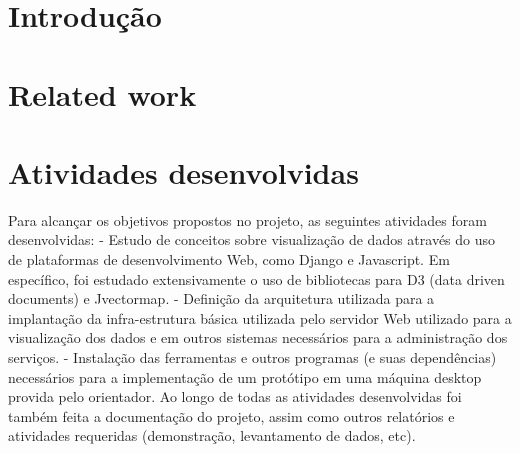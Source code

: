\documentclass[%
        TwoSidePages,%
        Portuguese,%
        TablesPage,%
        FiguresPage,%
        ]
{ic-tese-v2}
\begin{document}
\afterpreface

\chapter{Introdução}

\chapter{Related work}

\chapter{Atividades desenvolvidas}
Para alcançar os objetivos propostos no projeto, as seguintes atividades foram desenvolvidas:
- Estudo de conceitos sobre visualização de dados através do uso de plataformas de desenvolvimento Web, como Django e Javascript. Em específico, foi estudado extensivamente o uso de bibliotecas para D3 (data driven documents) e Jvectormap.
- Definição da arquitetura utilizada para a implantação da infra-estrutura básica utilizada pelo servidor Web utilizado para a visualização dos dados e em outros sistemas necessários para a administração dos serviços.
- Instalação das ferramentas e outros programas (e suas dependências) necessários para a implementação de um protótipo em uma máquina desktop provida pelo orientador.
Ao longo de todas as atividades desenvolvidas foi também feita a documentação do projeto, assim como outros relatórios e atividades requeridas (demonstração, levantamento de dados, etc).
\end{document}
